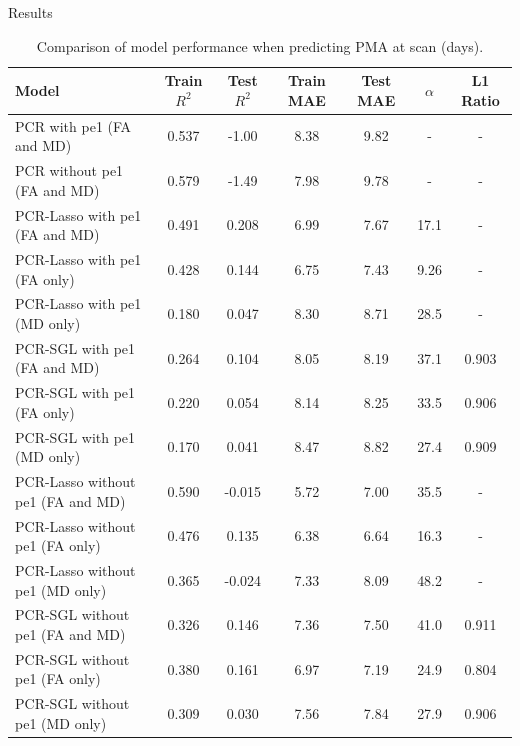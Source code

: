 \documentclass[final]{beamer}
\newlength{\colwidth}
\begin{document}
\begin{frame}[t]
\begin{columns}[t]
\begin{column}{\colwidth}
\begin{block}{Results}
    \begin{table}[ht]
      \centering
      \fontsize{8.5}{10}\selectfont
      \begin{tabularx}{\textwidth}{X c c c c c c}
        \toprule
        \textbf{Model} & \textbf{Train $R^2$} & \textbf{Test $R^2$} & \textbf{Train MAE} &
        \textbf{Test MAE} &
        \textbf{$\alpha$} &
        \textbf{L1 Ratio}\\
        \midrule
        PCR with pe1 (FA and MD) & 0.537 & -1.00 & 8.38 & 9.82 & - & - \\
        PCR without pe1 (FA and MD) & 0.579 & -1.49 & 7.98 & 9.78 & - & - \\
        \midrule
        PCR-Lasso with pe1 (FA and MD) & 0.491 & 0.208 & 6.99 & 7.67 & 17.1 & - \\
        PCR-Lasso with pe1 (FA only) & 0.428 & 0.144 & 6.75 & 7.43 & 9.26 & - \\
        PCR-Lasso with pe1 (MD only) & 0.180 & 0.047 & 8.30 & 8.71 & 28.5 & - \\
        \midrule
        PCR-SGL with pe1 (FA and MD) & 0.264 & 0.104 & 8.05 & 8.19 & 37.1 & 0.903 \\
        PCR-SGL with pe1 (FA only) & 0.220 & 0.054 & 8.14 & 8.25 & 33.5 & 0.906 \\
        PCR-SGL with pe1 (MD only) & 0.170 & 0.041 & 8.47 & 8.82 & 27.4 & 0.909 \\
        \midrule
        PCR-Lasso without pe1 (FA and MD) & 0.590 & -0.015 & 5.72 & 7.00 & 35.5 & - \\
        PCR-Lasso without pe1 (FA only) & 0.476 & 0.135 & 6.38 & 6.64 & 16.3 & - \\
        PCR-Lasso without pe1 (MD only) & 0.365 & -0.024 & 7.33 & 8.09 & 48.2 & - \\
        \midrule
        PCR-SGL without pe1 (FA and MD) & 0.326 & 0.146 & 7.36 & 7.50 & 41.0 & 0.911 \\
        PCR-SGL without pe1 (FA only) & 0.380 & 0.161 & 6.97 & 7.19 & 24.9 & 0.804 \\
        PCR-SGL without pe1 (MD only) & 0.309 & 0.030 & 7.56 & 7.84 & 27.9 & 0.906 \\
        \bottomrule
      \end{tabularx}
      \caption{Comparison of model performance when predicting PMA at scan (days).}
    \end{table}
    

\end{block}
\end{column}
\end{columns}
\end{frame}
\end{document}
